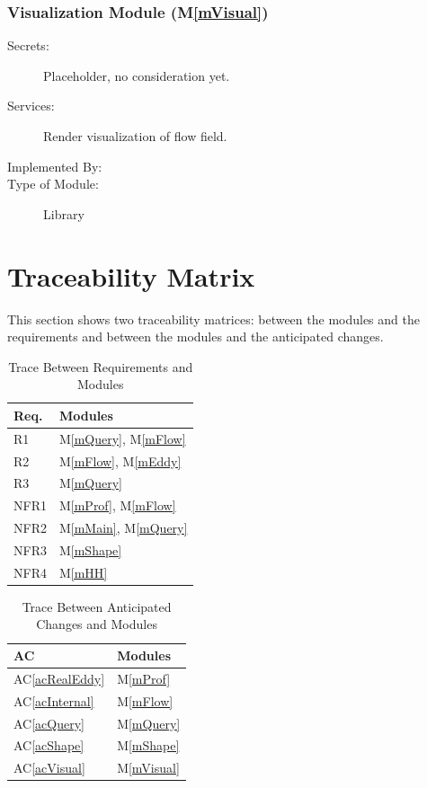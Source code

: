 \documentclass[12pt, titlepage]{article}
\newcommand{\acref}[1]{AC\ref{#1}}
\newcommand{\mref}[1]{M\ref{#1}}
\begin{document}
\subsubsection{Visualization Module (\mref{mVisual})}
\begin{description}
\item[Secrets:]Placeholder, no consideration yet.
\item[Services:]Render visualization of flow field.
\item[Implemented By:] \progname{}
\item[Type of Module:] Library
\end{description}

\section{Traceability Matrix} \label{SecTM}

This section shows two traceability matrices: between the modules and the
requirements and between the modules and the anticipated changes.

\begin{table}[H]
\centering
\begin{tabular}{p{} p{}}
\toprule
\textbf{Req.} & \textbf{Modules}\\
\midrule
R1 & \mref{mQuery}, \mref{mFlow}\\
R2 & \mref{mFlow}, \mref{mEddy}\\
R3 & \mref{mQuery}\\
NFR1 & \mref{mProf}, \mref{mFlow}\\
NFR2 & \mref{mMain}, \mref{mQuery}\\
NFR3 & \mref{mShape}\\
NFR4 & \mref{mHH}\\
\bottomrule
\end{tabular}
\caption{Trace Between Requirements and Modules}
\label{TblRT}
\end{table}

\begin{table}[H]
\centering
\begin{tabular}{p{} p{}}
\toprule
\textbf{AC} & \textbf{Modules}\\
\midrule
\acref{acRealEddy} & \mref{mProf}\\
\acref{acInternal} & \mref{mFlow}\\
\acref{acQuery} & \mref{mQuery}\\
\acref{acShape} & \mref{mShape}\\
\acref{acVisual} & \mref{mVisual}\\
\end{tabular}
\caption{Trace Between Anticipated Changes and Modules}
\label{TblACT}
\end{table}
\end{document}
